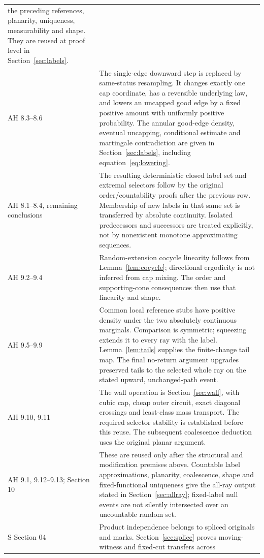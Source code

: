 \begin{longtable}{@{}>{\raggedright\arraybackslash}p{}>{\raggedright\arraybackslash}p{}@{}}
the preceding references, planarity, uniqueness, measurability and shape.
They are reused at proof level in Section~\ref{sec:labels}.\\
AH 8.3--8.6 & The single-edge downward step is replaced by same-status
resampling. It changes exactly one cap coordinate, has a reversible underlying
law, and lowers an uncapped good edge by a fixed positive amount with uniformly
positive probability. The annular good-edge density, eventual uncapping,
conditional estimate and martingale contradiction are given in
Section~\ref{sec:labels}, including equation~\eqref{eq:lowering}.\\
AH 8.1--8.4, remaining conclusions & The resulting deterministic closed label
set and extremal selectors follow by the original order/countability proofs
after the previous row. Membership of new labels in that same set is transferred
by absolute continuity. Isolated predecessors and successors are treated
explicitly, not by nonexistent monotone approximating sequences.\\
AH 9.2--9.4 & Random-extension cocycle linearity follows from
Lemma~\ref{lem:cocycle}; directional ergodicity is not inferred from cap mixing.
The order and supporting-cone consequences then use that linearity and shape.\\
AH 9.5--9.9 & Common local reference stubs have positive density under the
two absolutely continuous marginals. Comparison is symmetric; squeezing
extends it to every ray with the label. Lemma~\ref{lem:tails} supplies the
finite-change tail map. The final no-return argument upgrades preserved tails
to the selected whole ray on the stated upward, unchanged-path event.\\
AH 9.10, 9.11 & The wall operation is Section~\ref{sec:wall}, with cubic cap,
cheap outer circuit, exact diagonal crossings and least-class mass transport.
The required selector stability is established before this reuse. The
subsequent coalescence deduction uses the original planar argument.\\
AH 9.1, 9.12--9.13; Section 10 & These are reused only after the structural
and modification premises above. Countable label approximations, planarity,
coalescence, shape and fixed-functional uniqueness give the all-ray output
stated in Section~\ref{sec:allray}; fixed-label null events are not silently
intersected over an uncountable random set.\\
S Section 04 & Product independence belongs to spliced originals and marks.
Section~\ref{sec:splice} proves moving-witness and fixed-cut transfers across

\end{longtable}
